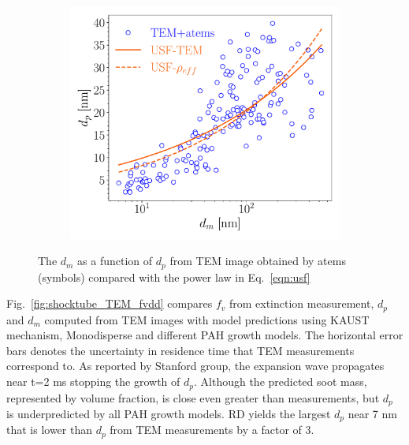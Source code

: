 \begin{figure}[H]
	\centering
	\begin{subfigure}[t]{0.32\textwidth}
		\includegraphics[width=1\textwidth]{Figures/Results/Shocktube/Stanford/TEM/dmdp_scalelaw.pdf}
	\end{subfigure}
	\caption{The $d_m$ as a function of $d_p$ from TEM image obtained by atems~\citep{sipkens2021using} (symbols) compared with the power law in Eq.~\eqref{eqn:usf}} 
	\label{fig:shocktube_TEM_powerlaws} 
\end{figure}

Fig.~\ref{fig:shocktube_TEM_fvdd} compares $f_v$ from extinction measurement, $d_p$ and $d_m$ computed from TEM images with model predictions using KAUST mechanism, Monodisperse and different PAH growth models. The horizontal error bars denotes the uncertainty in residence time that TEM measurements correspond to. As reported by Stanford group, the expansion wave propagates near t=2 ms stopping the growth of $d_p$. Although the predicted soot mass, represented by volume fraction, is close even greater than measurements, but $d_p$ is underpredicted by all PAH growth models. RD yields the largest $d_p$ near 7 nm that is lower than $d_p$ from TEM measurements by a factor of 3.

